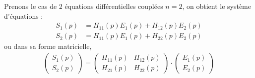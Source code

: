 Prenons le cas de 2 équations différentielles couplées $n=2$, on obtient 
le système d'équations  :
\begin{align*}
    S_1(p) &= H_{11}(p) E_1(p) + H_{12}(p) E_2(p) \\
    S_2(p) &= H_{11}(p) E_1(p) + H_{22}(p) E_2(p)
\end{align*}
ou dans sa forme matricielle, 
\begin{align*}
    \begin{pmatrix} 
        S_1(p)\\
        S_2(p)
    \end{pmatrix}=
    \begin{pmatrix} 
        H_{11}(p) & H_{12}(p) \\
        H_{21}(p) & H_{22}(p) 
    \end{pmatrix}\cdot
    \begin{pmatrix} 
        E_1(p)\\
        E_2(p)
    \end{pmatrix}
\end{align*}
